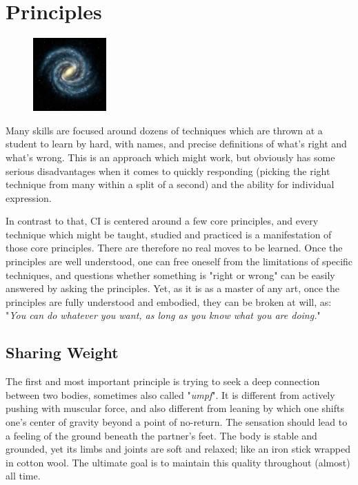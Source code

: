 \section{Principles}

\begin{figure}
\centering
\includegraphics[width=0.25\textwidth]{images/principles.jpg}
\end{figure}

Many skills are focused around dozens of techniques which are thrown at a student to learn by hard, with names, and precise definitions of what's right and what's wrong. This is an approach which might work, but obviously has some serious disadvantages when it comes to quickly responding (picking the right technique from many within a split of a second) and the ability for individual expression.

In contrast to that, CI is centered around a few core principles, and every technique which might be taught, studied and practiced is a manifestation of those core principles. There are therefore no real moves to be learned. Once the principles are well understood, one can free oneself from the limitations of specific techniques, and questions whether something is "right or wrong" can be easily answered by asking the principles. Yet, as it is as a master of any art, once the principles are fully understood and embodied, they can be broken at will, as: "\textit{You can do whatever you want, as long as you know what you are doing.}"

\subsection{Sharing Weight}

The first and most important principle is trying to seek a deep connection between two bodies, sometimes also called "\textit{umpf}". It is different from actively pushing with muscular force, and also different from leaning by which one shifts one's center of gravity beyond a point of no-return. The sensation should lead to a feeling of the ground beneath the partner's feet. The body is stable and grounded, yet its limbs and joints are soft and relaxed; like an iron stick wrapped in cotton wool. The ultimate goal is to maintain this quality throughout (almost) all time.

